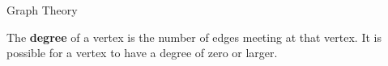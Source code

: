    \begin{frame}[fragile]{Graph Theory}


\begin{definition}
The \textbf{degree} of a vertex is the number of edges meeting at that vertex.  It is possible for a vertex to have a degree of zero or larger.
\end{definition}




\end{frame}

